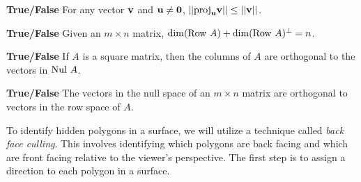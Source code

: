 	\item \textbf{True/False}	For any vector $\mathbf{v}$ and $\mathbf{u}\neq \mathbf{0}$, $||\text{proj}_{\mathbf{u}} \mathbf{v}|| \leq ||\mathbf{v}||$.
	\item \textbf{True/False}	Given an $m\times n$ matrix, $\dim(\text{Row } A)+\dim(\text{Row } A)^\perp = n$.
	\item \textbf{True/False} If $A$ is a square matrix, then the columns of $A$ are orthogonal to the vectors in $\text{Nul } A$. 
	\item \textbf{True/False} The vectors in the null space of an $m \times n$ matrix are orthogonal to vectors in the row space of $A$. 

	\ea
\ee

\label{sec:proj_back_face}

To identify hidden polygons in a surface, we will utilize a technique called \emph{back face culling}. This involves identifying which polygons are back facing and which are front facing relative to the viewer's perspective. The first step is to assign a direction to each polygon in a surface. 


